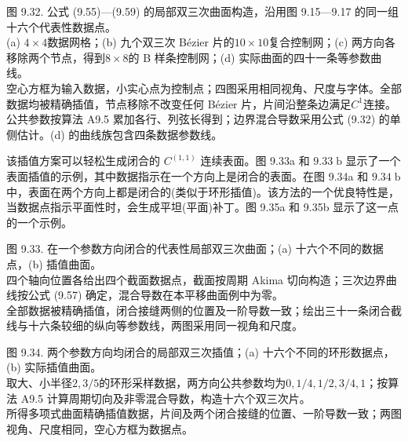 \documentclass[../main.tex]{subfiles}
\begin{document}
\begin{center}
\begin{minipage}{29cm}
\vspace*{.6\baselineskip}
\centering
{}
\par\smallskip
{}
\par\smallskip
图 9.32. 公式 (9.55)—(9.59) 的局部双三次曲面构造，沿用图 9.15—9.17 的同一组十六个代表性数据点。\\
(a) $4\times4$数据网格；(b) 九个双三次 Bézier 片的$10\times10$复合控制网；(c) 两方向各移除两个节点，得到$8\times8$的 B 样条控制网；(d) 实际曲面的四十一条等参数曲线。\\
空心方框为输入数据，小实心点为控制点；四图采用相同视角、尺度与字体。全部数据均被精确插值，节点移除不改变任何 Bézier 片，片间沿整条边满足$C^1$连接。\\
公共参数按算法 A9.5 累加各行、列弦长得到；边界混合导数采用公式 (9.32) 的单侧估计。(d) 的曲线族包含四条数据参数线。
\end{minipage}
\end{center}

该插值方案可以轻松生成闭合的 \({C}^{\left( 1,1\right) }\) 连续表面。图 9.33a 和 \({9.33}\mathrm{\;b}\) 显示了一个表面插值的示例，其中数据指示在一个方向上是闭合的表面。在图 9.34a 和 \({9.34}\mathrm{\;b}\) 中，表面在两个方向上都是闭合的(类似于环形插值)。该方法的一个优良特性是，当数据点指示平面性时，会生成平坦(平面)补丁。图 9.35a 和 9.35b 显示了这一点的一个示例。

\begin{center}
\begin{minipage}{35cm}
\vspace*{.6\baselineskip}
\centering
{}
\par\smallskip
图 9.33. 在一个参数方向闭合的代表性局部双三次曲面；(a) 十六个不同的数据点，(b) 插值曲面。\\
四个轴向位置各给出四个截面数据点，截面按周期 Akima 切向构造；三次边界曲线按公式 (9.57) 确定，混合导数在本平移曲面例中为零。\\
全部数据被精确插值，闭合接缝两侧的位置及一阶导数一致；绘出三十一条闭合截线与十六条较细的纵向等参数线，两图采用同一视角和尺度。
\end{minipage}
\end{center}

\begin{center}
\begin{minipage}{35cm}
\vspace*{.6\baselineskip}
\centering
{}
\par\smallskip
图 9.34. 两个参数方向均闭合的局部双三次插值；(a) 十六个不同的环形数据点，(b) 实际插值曲面。\\
取大、小半径$2,3/5$的环形采样数据，两方向公共参数均为$0,1/4,1/2,3/4,1$；按算法 A9.5 计算周期切向及非零混合导数，构造十六个双三次片。\\
所得多项式曲面精确插值数据，片间及两个闭合接缝的位置、一阶导数一致；两图视角、尺度相同，空心方框为数据点。
\end{minipage}
\end{center}
\end{document}
